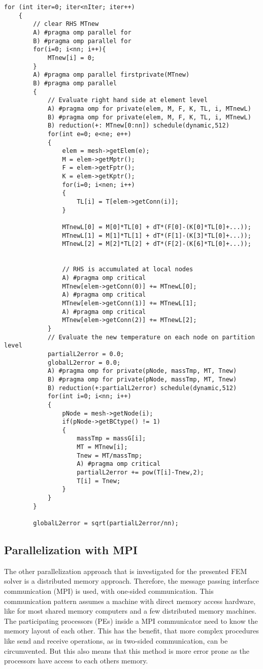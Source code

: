 \begin{lstlisting}[caption={\label{Code:OpenMP} Parallelization of two most time consuming loops with implementation A and B}]
	for (int iter=0; iter<nIter; iter++)
	{
		// clear RHS MTnew
		A) #pragma omp parallel for
		B) #pragma omp parallel for
		for(i=0; i<nn; i++){
			MTnew[i] = 0;
		}
		A) #pragma omp parallel firstprivate(MTnew)
		B) #pragma omp parallel
		{
			// Evaluate right hand side at element level
			A) #pragma omp for private(elem, M, F, K, TL, i, MTnewL)
			B) #pragma omp for private(elem, M, F, K, TL, i, MTnewL) 
			B) reduction(+: MTnew[0:nn]) schedule(dynamic,512)
			for(int e=0; e<ne; e++)
			{
				elem = mesh->getElem(e);
				M = elem->getMptr();
				F = elem->getFptr();
				K = elem->getKptr();
				for(i=0; i<nen; i++)
				{
					TL[i] = T[elem->getConn(i)];
				}
				
				MTnewL[0] = M[0]*TL[0] + dT*(F[0]-(K[0]*TL[0]+...));
				MTnewL[1] = M[1]*TL[1] + dT*(F[1]-(K[3]*TL[0]+...));
				MTnewL[2] = M[2]*TL[2] + dT*(F[2]-(K[6]*TL[0]+...));
				
				
				// RHS is accumulated at local nodes
				A) #pragma omp critical
				MTnew[elem->getConn(0)] += MTnewL[0];
				A) #pragma omp critical
				MTnew[elem->getConn(1)] += MTnewL[1];
				A) #pragma omp critical
				MTnew[elem->getConn(2)] += MTnewL[2];
			}
			// Evaluate the new temperature on each node on partition level
			partialL2error = 0.0;
			globalL2error = 0.0;
			A) #pragma omp for private(pNode, massTmp, MT, Tnew)
			B) #pragma omp for private(pNode, massTmp, MT, Tnew) 
			B) reduction(+:partialL2error) schedule(dynamic,512)
			for(int i=0; i<nn; i++)
			{
				pNode = mesh->getNode(i);
				if(pNode->getBCtype() != 1)
				{
					massTmp = massG[i];
					MT = MTnew[i];
					Tnew = MT/massTmp;
					A) #pragma omp critical
					partialL2error += pow(T[i]-Tnew,2);
					T[i] = Tnew;
				}
			}
		}
		
		globalL2error = sqrt(partialL2error/nn);
\end{lstlisting}

\subsection{Parallelization with MPI}

The other parallelization approach that is investigated for the presented FEM solver is a distributed memory approach. Therefore, the message passing interface communication (MPI) is used, with one-sided communication. This communication pattern assumes a machine with direct memory access hardware, like for most shared memory computers and a few distributed memory machines. The participating processors (PEs) inside a MPI communicator need to know the memory layout of each other. This has the benefit, that more complex procedures like send and receive operations, as in two-sided communication, can be circumvented. But this also means that this method is more error prone as the processors have access to each others memory. 

